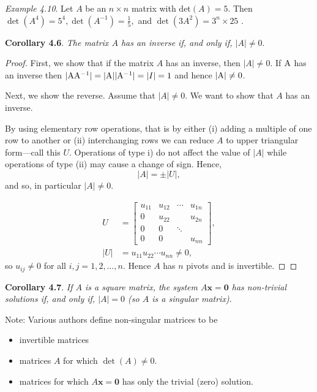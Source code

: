 \documentclass[
  letterpaper,
  DIV=11,
  numbers=noendperiod]{scrartcl}
\theoremstyle{remark}
\begin{document}
\emph{Example 4.10}. Let \(A\) be an \(n\times n\) matrix with
\(\textrm{det}(A)=5\). Then \(\det \left( A^{4}\right)
=5^{4},\det \left( A^{-1}\right) =\frac{1}{5},\) and
\(\det \left( 3A^{2}\right)
=3^{n}\times 25\) .

\textbf{Corollary 4.6}. \emph{The matrix \(A\) has an inverse if, and
only if, \(\left|
A\right| \neq 0.\)}

\begin{proof}
First, we show that if the matrix \(A\) has an inverse, then
\(|A|\neq 0\). If \({\rm A}\) has an inverse then
\(|{\rm A}{\rm A^{-1}}| = |{\rm A}||{\rm A^{-1}}| =| I | = 1\) and hence
\(|{\rm A}| \neq 0\).

Next, we show the reverse. Assume that \(|A|\neq 0\). We want to show
that \(A\) has an inverse.

By using elementary row operations, that is by either (i) adding a
multiple of one row to another or (ii) interchanging rows we can reduce
\(A\) to upper triangular form---call this \(U.\) Operations of type i)
do not affect the value of \(\left| A\right|\) while operations of type
(ii) may cause a change of sign. Hence,
\[\left| A\right| =\pm \left| U\right|,\] and so, in particular
\(|A|\neq0\).

\[\begin{aligned}
U&=\left[ 
\begin{array}{cccc}
u_{11} & u_{12} & \cdots & u_{1n} \\ 
0 & u_{22} &  & u_{2n} \\ 
0 & 0 & \ddots &  \\ 
0 & 0 &  & u_{nn}
\end{array}
\right],\\
\left| U\right| &= u_{11}u_{22}\cdots u_{nn}\neq 0,
\end{aligned}\] so \(u_{ij}\neq 0\) for all \(i,j=1,2,\dots,n\). Hence
\(A\) has \(n\) pivots and is invertible.~◻
\end{proof}

\textbf{Corollary 4.7}. \emph{If \(A\) is a square matrix, the system
\(A\mathbf{x=0}\) has non-trivial solutions if, and only if,
\(\left| A\right| =0\) (so \(A\) is a singular matrix).}

Note: Various authors define non-singular matrices to be

\begin{itemize}
\item
  invertible matrices
\item
  matrices \(A\) for which \(\det(A)\neq 0\).
\item
  matrices for which \(A\mathbf{x}=\mathbf{0}\) has only the trivial
  (zero) solution.
\end{itemize}
\end{document}

